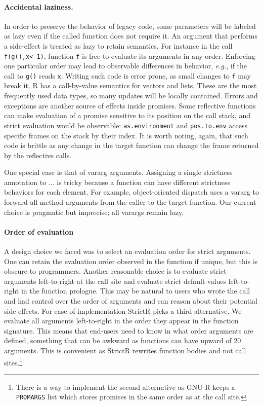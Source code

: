 \documentclass[review,creen,acmsmall]{acmart}
\renewcommand{\c}[1]{\lstinline |#1|\xspace}
\newcommand{\strictr}{{\sf StrictR}\xspace}
\newcommand{\eg}{\emph{e.g.},\xspace}
\begin{document}
\paragraph{Accidental laziness.} In order to preserve the behavior of legacy
code, some parameters will be labeled as lazy even if the called function does
not require it. An argument that performs a side-effect is treated as lazy to
retain semantics. For instance in the call \c{f(g(),x<-1)}, function \c f is
free to evaluate its arguments in any order. Enforcing one particular order may
lead to observable differences in behavior, \eg if the call to \c{g()} reads
\c{x}. Writing such code is error prone, as small changes to \c f may break it.
R has a call-by-value semantics for vectors and lists. These are the most
frequently used data types, so many updates will be locally contained. Errors
and exceptions are another source of effects inside promises. Some reflective
functions can make evaluation of a promise sensitive to its position on the call
stack, and strict evaluation would be observable: \c{as.environment} and
\c{pos.to.env} access specific frames on the stack by their index. It is
worth noting, again, that such code is brittle as any change in the target
function can change the frame returned by the reflective calls.

One special case is that of vararg arguments. Assigning a single strictness
annotation to $\dots$ is tricky because a function can have different strictness
behaviors for each element. For example, object-oriented dispatch uses a vararg
to forward all method arguments from the caller to the target function.
Our current choice is pragmatic but imprecise; all varargs remain lazy.


\paragraph{Order of evaluation} A design choice we faced
was to select an evaluation order for strict arguments. One can retain the
evaluation order observed in the function if unique, but this is obscure to
programmers. Another reasonable choice is to evaluate strict arguments
left-to-right at the call site and evaluate strict default values left-to-right
in the function prologue. This may be natural to users who wrote the call and
had control over the order of arguments and can reason about their potential
side effects. For ease of implementation \strictr picks a third alternative. We evaluate
all arguments left-to-right in the order they appear in the function signature.
This means that end-users need to know in what order arguments are defined,
something that can be awkward as functions can have upward of 20 arguments. This
is convenient as \strictr rewrites function bodies and not call
sites.\footnote{There is a way to implement the second alternative as GNU R
keeps a \c{PROMARGS} list which stores promises in the same order as at the call
site.}
\end{document}
